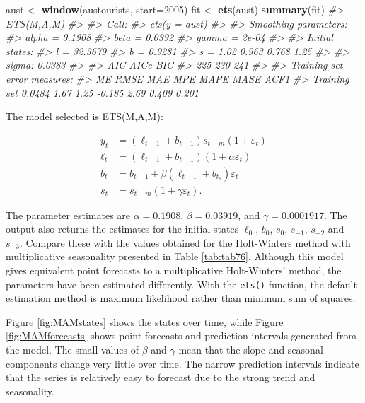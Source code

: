 \documentclass[]{book}
\newenvironment{Shaded}{\begin{snugshade}}{\end{snugshade}}
\newcommand{\CommentTok}[1]{\textcolor[rgb]{0.56,0.35,0.01}{\textit{#1}}}
\newcommand{\DataTypeTok}[1]{\textcolor[rgb]{0.13,0.29,0.53}{#1}}
\newcommand{\DecValTok}[1]{\textcolor[rgb]{0.00,0.00,0.81}{#1}}
\newcommand{\KeywordTok}[1]{\textcolor[rgb]{0.13,0.29,0.53}{\textbf{#1}}}
\newcommand{\NormalTok}[1]{#1}
\newcommand{\StringTok}[1]{\textcolor[rgb]{0.31,0.60,0.02}{#1}}
\begin{document}
\begin{Shaded}
\begin{Highlighting}[]
\NormalTok{aust <-}\StringTok{ }\KeywordTok{window}\NormalTok{(austourists, }\DataTypeTok{start=}\DecValTok{2005}\NormalTok{)}
\NormalTok{fit <-}\StringTok{ }\KeywordTok{ets}\NormalTok{(aust)}
\KeywordTok{summary}\NormalTok{(fit)}
\CommentTok{#> ETS(M,A,M) }
\CommentTok{#> }
\CommentTok{#> Call:}
\CommentTok{#>  ets(y = aust) }
\CommentTok{#> }
\CommentTok{#>   Smoothing parameters:}
\CommentTok{#>     alpha = 0.1908 }
\CommentTok{#>     beta  = 0.0392 }
\CommentTok{#>     gamma = 2e-04 }
\CommentTok{#> }
\CommentTok{#>   Initial states:}
\CommentTok{#>     l = 32.3679 }
\CommentTok{#>     b = 0.9281 }
\CommentTok{#>     s = 1.02 0.963 0.768 1.25}
\CommentTok{#> }
\CommentTok{#>   sigma:  0.0383}
\CommentTok{#> }
\CommentTok{#>  AIC AICc  BIC }
\CommentTok{#>  225  230  241 }
\CommentTok{#> }
\CommentTok{#> Training set error measures:}
\CommentTok{#>                  ME RMSE  MAE    MPE MAPE  MASE  ACF1}
\CommentTok{#> Training set 0.0484 1.67 1.25 -0.185 2.69 0.409 0.201}
\end{Highlighting}
\end{Shaded}

The model selected is ETS(M,A,M):

\begin{align*}
y_{t} &= (\ell_{t-1} + b_{t-1})s_{t-m}(1 + \varepsilon_t)\\
\ell_t &= (\ell_{t-1} + b_{t-1})(1 + \alpha \varepsilon_t)\\
b_t &=b_{t-1} + \beta(\ell_{t-1} + b_{t_1})\varepsilon_t\\
s_t &=  s_{t-m}(1+ \gamma \varepsilon_t).
\end{align*}

The parameter estimates are \(\alpha=0.1908\), \(\beta=0.03919\), and \(\gamma=0.0001917\). The output also returns the estimates for the initial states \(\ell_0\), \(b_0\), \(s_{0}\), \(s_{-1}\), \(s_{-2}\) and \(s_{-3}.\) Compare these with the values obtained for the Holt-Winters method with multiplicative seasonality presented in Table \ref{tab:tab76}. Although this model gives equivalent point forecasts to a multiplicative Holt-Winters' method, the parameters have been estimated differently. With the \texttt{ets()} function, the default estimation method is maximum likelihood rather than minimum sum of squares.

Figure \ref{fig:MAMstates} shows the states over time, while Figure \ref{fig:MAMforecasts} shows point forecasts and prediction intervals generated from the model. The small values of \(\beta\) and \(\gamma\) mean that the slope and seasonal components change very little over time. The narrow prediction intervals indicate that the series is relatively easy to forecast due to the strong trend and seasonality.
\end{document}
